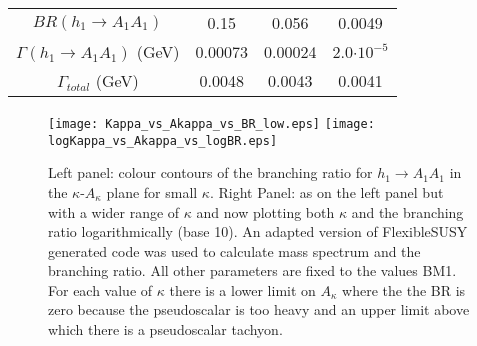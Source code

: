 \documentclass[12pt,a4paper]{article}
\newcommand{\ds}{\displaystyle}
\begin{document}
\begin{table}
\begin{tabular}{| c || c | c | c |}
$BR(h_1\rightarrow A_1A_1)$       & 	0.15          & 	0.056                   & 	0.0049                                 \\
$\Gamma(h_1\rightarrow A_1A_1)$ (GeV)& 	0.00073           & 	0.00024                & 	2.0$\cdot10^{-5}$                                \\ 
$\Gamma_{total}$ (GeV)            & 	0.0048             & 	0.0043                   & 	0.0041                                  \\                                                                
\hline                                                                                                 
\end{tabular}

\end{table}





 

\begin{figure}[h!]
        \texttt{[image: Kappa\_vs\_Akappa\_vs\_BR\_low.eps]}
        \texttt{[image: logKappa\_vs\_Akappa\_vs\_logBR.eps]}
	\caption{Left panel: colour contours of the branching ratio for $h_1\rightarrow A_1 A_1$ in the  $\kappa$-$A_\kappa$ plane for small $\kappa$. Right Panel: as on the left panel but with a wider range of $\kappa$ and now plotting  both $\kappa$ and the branching ratio logarithmically (base 10).  An adapted version of FlexibleSUSY generated code was used to calculate mass spectrum and the branching ratio.  All other parameters are fixed to the values BM1.  For each value of $\kappa$ there is a lower limit on $A_\kappa$ where the the BR is zero because the pseudoscalar is too heavy and an upper limit above which there is a pseudoscalar tachyon.   }


\end{figure}











\end{document}
